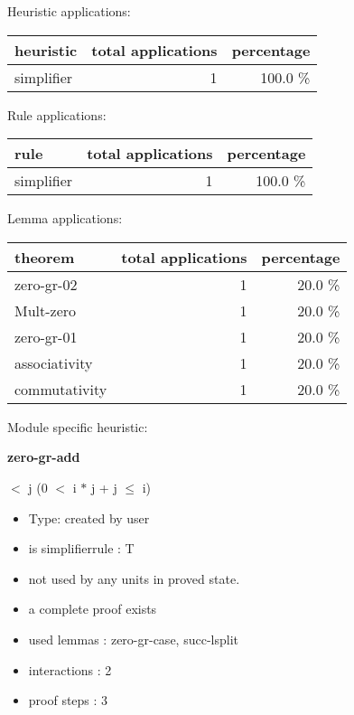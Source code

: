 \documentclass[a4paper]{article}
\begin{document}
\medskip


Heuristic applications:

\begin{supertabular}{l|r|r}
heuristic	& total applications & percentage \\ \hline
simplifier & 1 & 100.0 \% \\

\end{supertabular}

Rule applications:

\begin{supertabular}{l|r|r}
rule	        & total applications & percentage \\ \hline
simplifier & 1 & 100.0 \% \\

\end{supertabular}

Lemma applications:

\begin{supertabular}{l|r|r}
theorem	        & total applications & percentage \\ \hline
zero-gr-02 & 1 & 20.0 \% \\
Mult-zero & 1 & 20.0 \% \\
zero-gr-01 & 1 & 20.0 \% \\
associativity & 1 & 20.0 \% \\
commutativity & 1 & 20.0 \% \\

\end{supertabular}

Module specific heuristic:

\pagebreak

{\LARGE\bf zero-gr-add}\label{lemma-zero-gr-add}

\medskip

  $<$ j \Imp (0 $<$ i $*$ j + j  $\le$ i)

\begin{itemize}

\item Type: created by user

\item is simplifierrule : T
\item not used by any units in proved state.
\item       a complete proof exists
\item       used lemmas  : zero-gr-case, succ-lsplit
\item       interactions : 2
\item       proof steps  : 3
\end{itemize}
\end{document}
